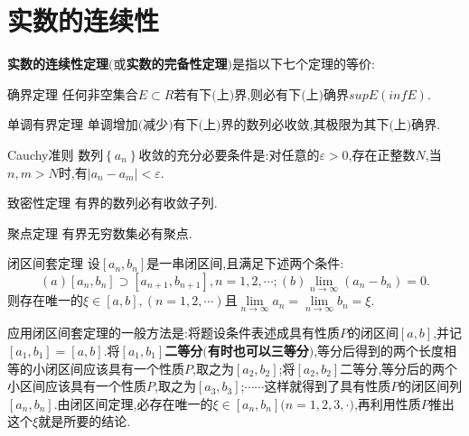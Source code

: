 \section{实数的连续性}

\textbf{实数的连续性定理}$($或\textbf{实数的完备性定理}$)$是指以下七个定理的等价:

\begin{theorem}{确界定理}
	任何非空集合$E\subset R$若有下$($上$)$界,则必有下$($上$)$确界$supE(infE)$.
\end{theorem}

\begin{theorem}{单调有界定理}
	单调增加$($减少$)$有下$($上$)$界的数列必收敛,其极限为其下$($上$)$确界.
\end{theorem}

\begin{theorem}{Cauchy准则}
	数列$\left\{ a_n \right\} $收敛的充分必要条件是:对任意的$\varepsilon >0$,存在正整数$N$,当$n,m>N$时,有$\left| a_n-a_m \right|<\varepsilon $.
\end{theorem}

\begin{theorem}{致密性定理}
	有界的数列必有收敛子列.
\end{theorem}

\begin{theorem}{聚点定理}
	有界无穷数集必有聚点.
\end{theorem}

\begin{theorem}{闭区间套定理}
	设$\left[ a_n,b_n \right] $是一串闭区间,且满足下述两个条件:
	$$
		\left( a \right) \left[ a_n,b_n \right] \supset \left[ a_{n+1},b_{n+1} \right] ,n=1,2,\cdots ;\left( b \right) \lim_{n\rightarrow \infty}\left( a_n-b_n \right) =0.
	$$
	则存在唯一的$\xi \in \left[ a,b \right] ,\left( n=1,2,\cdots \right) $且$\lim\limits_{n\rightarrow \infty}a_n=\lim\limits_{n\rightarrow \infty}b_n=\xi $.
\end{theorem}

\begin{note}
	应用闭区间套定理的一般方法是:将题设条件表述成具有性质$P$的闭区间$[a,b]$,并记$[a_1,b_1]=[a,b]$.将$[a_1,b_1]$\textbf{二等分$($有时也可以三等分$)$},等分后得到的两个长度相等的小闭区间应该具有一个性质$P$,取之为$[a_2,b_2]$;将$[a_2,b_2]$二等分,等分后的两个小区间应该具有一个性质$P$,取之为$[a_3,b_3]$;$\cdots \cdots $这样就得到了具有性质$P$的闭区间列${[a_n,b_n]}$.由闭区间定理,必存在唯一的$\xi \in [a_n,b_n]$$($$n=1,2,3,\cdot$$)$,再利用性质$P$推出这个$\xi$就是所要的结论.
\end{note}

